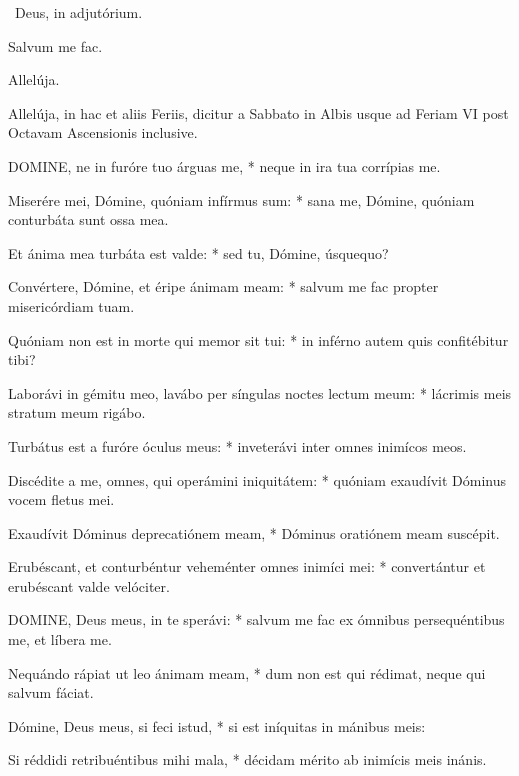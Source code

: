 \V\ Deus, in adjutórium.


 Salvum me fac.


 Allelúja.

 Allelúja, in hac et aliis Feriis, dicitur a Sabbato in Albis usque ad Feriam VI post Octavam Ascensionis inclusive.



\lettrine[lines=2]{D}{OMINE}, ne in furóre tuo árguas me, * neque in ira tua corrípias me.

Miserére mei, Dómine, quóniam infírmus sum: * sana me, Dómine, quóniam conturbáta sunt ossa mea.

Et ánima mea turbáta est valde: * sed tu, Dómine, úsquequo?

Convértere, Dómine, et éripe ánimam meam: * salvum me fac propter misericórdiam tuam.

Quóniam non est in morte qui memor sit tui: * in inférno autem quis confitébitur tibi?

Laborávi in gémitu meo, lavábo per síngulas noctes lectum meum: * lácrimis meis stratum meum rigábo.

Turbátus est a furóre óculus meus: * inveterávi inter omnes inimícos meos.

Discédite a me, omnes, qui operámini iniquitátem: * quóniam exaudívit Dóminus vocem fletus mei.

Exaudívit Dóminus deprecatiónem meam, * Dóminus oratiónem meam suscépit.

Erubéscant, et conturbéntur veheménter omnes inimíci mei: * convertántur et erubéscant valde velóciter.


\lettrine[lines=2]{D}{OMINE}, Deus meus, in te sperávi: * salvum me fac ex ómnibus persequéntibus me, et líbera me.

Nequándo rápiat ut leo ánimam meam, * dum non est qui rédimat, neque qui salvum fáciat.

Dómine, Deus meus, si feci istud, * si est iníquitas in mánibus meis:

Si réddidi retribuéntibus mihi mala, * décidam mérito ab inimícis meis inánis.

